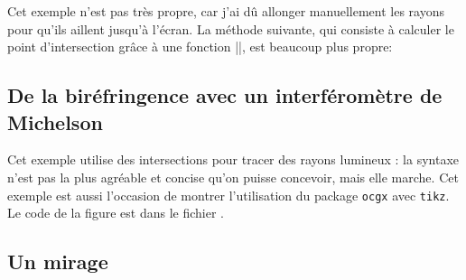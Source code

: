 \documentclass[a4paper]{ltxdoc}
\begin{document}
  Cet exemple n'est pas très propre, car j'ai dû allonger manuellement les rayons pour qu'ils aillent jusqu'à l'écran. La méthode suivante, qui consiste à calculer le point d'intersection grâce à une fonction |\toVerticalProjection|, est beaucoup plus propre:

\begin{codeexample}[]
\end{codeexample}

\subsection{De la biréfringence avec un interféromètre de Michelson}



Cet exemple utilise des intersections pour tracer des rayons lumineux : la syntaxe n'est pas la plus agréable et concise qu'on puisse concevoir, mais elle marche. 
Cet exemple est aussi l'occasion de montrer l'utilisation du package \texttt{ocgx} avec \texttt{tikz}.
Le code de la figure est dans le fichier .

\subsection{Un mirage}
\end{document}
